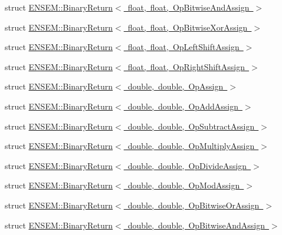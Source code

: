 \begin{DoxyCompactItemize}
\item 
struct \mbox{\hyperlink{structENSEM_1_1BinaryReturn_3_01float_00_01float_00_01OpBitwiseAndAssign_01_4}{E\+N\+S\+E\+M\+::\+Binary\+Return$<$ float, float, Op\+Bitwise\+And\+Assign $>$}}
\item 
struct \mbox{\hyperlink{structENSEM_1_1BinaryReturn_3_01float_00_01float_00_01OpBitwiseXorAssign_01_4}{E\+N\+S\+E\+M\+::\+Binary\+Return$<$ float, float, Op\+Bitwise\+Xor\+Assign $>$}}
\item 
struct \mbox{\hyperlink{structENSEM_1_1BinaryReturn_3_01float_00_01float_00_01OpLeftShiftAssign_01_4}{E\+N\+S\+E\+M\+::\+Binary\+Return$<$ float, float, Op\+Left\+Shift\+Assign $>$}}
\item 
struct \mbox{\hyperlink{structENSEM_1_1BinaryReturn_3_01float_00_01float_00_01OpRightShiftAssign_01_4}{E\+N\+S\+E\+M\+::\+Binary\+Return$<$ float, float, Op\+Right\+Shift\+Assign $>$}}
\item 
struct \mbox{\hyperlink{structENSEM_1_1BinaryReturn_3_01double_00_01double_00_01OpAssign_01_4}{E\+N\+S\+E\+M\+::\+Binary\+Return$<$ double, double, Op\+Assign $>$}}
\item 
struct \mbox{\hyperlink{structENSEM_1_1BinaryReturn_3_01double_00_01double_00_01OpAddAssign_01_4}{E\+N\+S\+E\+M\+::\+Binary\+Return$<$ double, double, Op\+Add\+Assign $>$}}
\item 
struct \mbox{\hyperlink{structENSEM_1_1BinaryReturn_3_01double_00_01double_00_01OpSubtractAssign_01_4}{E\+N\+S\+E\+M\+::\+Binary\+Return$<$ double, double, Op\+Subtract\+Assign $>$}}
\item 
struct \mbox{\hyperlink{structENSEM_1_1BinaryReturn_3_01double_00_01double_00_01OpMultiplyAssign_01_4}{E\+N\+S\+E\+M\+::\+Binary\+Return$<$ double, double, Op\+Multiply\+Assign $>$}}
\item 
struct \mbox{\hyperlink{structENSEM_1_1BinaryReturn_3_01double_00_01double_00_01OpDivideAssign_01_4}{E\+N\+S\+E\+M\+::\+Binary\+Return$<$ double, double, Op\+Divide\+Assign $>$}}
\item 
struct \mbox{\hyperlink{structENSEM_1_1BinaryReturn_3_01double_00_01double_00_01OpModAssign_01_4}{E\+N\+S\+E\+M\+::\+Binary\+Return$<$ double, double, Op\+Mod\+Assign $>$}}
\item 
struct \mbox{\hyperlink{structENSEM_1_1BinaryReturn_3_01double_00_01double_00_01OpBitwiseOrAssign_01_4}{E\+N\+S\+E\+M\+::\+Binary\+Return$<$ double, double, Op\+Bitwise\+Or\+Assign $>$}}
\item 
struct \mbox{\hyperlink{structENSEM_1_1BinaryReturn_3_01double_00_01double_00_01OpBitwiseAndAssign_01_4}{E\+N\+S\+E\+M\+::\+Binary\+Return$<$ double, double, Op\+Bitwise\+And\+Assign $>$}}

\end{DoxyCompactItemize}
